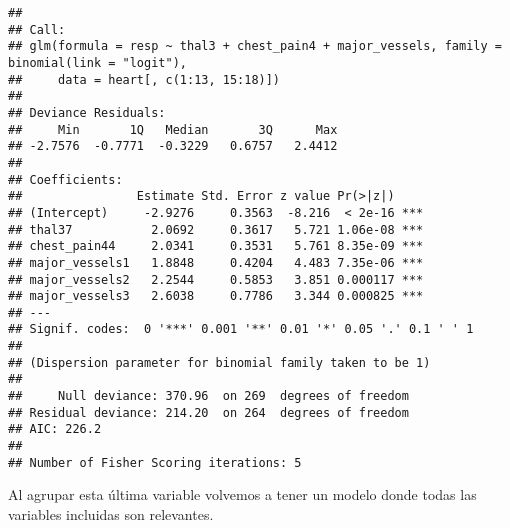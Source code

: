 \documentclass[]{article}
\newenvironment{Shaded}{\begin{snugshade}}{\end{snugshade}}
\newcommand{\KeywordTok}[1]{\textcolor[rgb]{0.13,0.29,0.53}{\textbf{#1}}}
\newcommand{\DataTypeTok}[1]{\textcolor[rgb]{0.13,0.29,0.53}{#1}}
\newcommand{\DecValTok}[1]{\textcolor[rgb]{0.00,0.00,0.81}{#1}}
\newcommand{\StringTok}[1]{\textcolor[rgb]{0.31,0.60,0.02}{#1}}
\newcommand{\OperatorTok}[1]{\textcolor[rgb]{0.81,0.36,0.00}{\textbf{#1}}}
\newcommand{\NormalTok}[1]{#1}
\begin{document}
\begin{Shaded}
\end{Shaded}

\begin{verbatim}
## 
## Call:
## glm(formula = resp ~ thal3 + chest_pain4 + major_vessels, family = binomial(link = "logit"), 
##     data = heart[, c(1:13, 15:18)])
## 
## Deviance Residuals: 
##     Min       1Q   Median       3Q      Max  
## -2.7576  -0.7771  -0.3229   0.6757   2.4412  
## 
## Coefficients:
##                Estimate Std. Error z value Pr(>|z|)    
## (Intercept)     -2.9276     0.3563  -8.216  < 2e-16 ***
## thal37           2.0692     0.3617   5.721 1.06e-08 ***
## chest_pain44     2.0341     0.3531   5.761 8.35e-09 ***
## major_vessels1   1.8848     0.4204   4.483 7.35e-06 ***
## major_vessels2   2.2544     0.5853   3.851 0.000117 ***
## major_vessels3   2.6038     0.7786   3.344 0.000825 ***
## ---
## Signif. codes:  0 '***' 0.001 '**' 0.01 '*' 0.05 '.' 0.1 ' ' 1
## 
## (Dispersion parameter for binomial family taken to be 1)
## 
##     Null deviance: 370.96  on 269  degrees of freedom
## Residual deviance: 214.20  on 264  degrees of freedom
## AIC: 226.2
## 
## Number of Fisher Scoring iterations: 5
\end{verbatim}

Al agrupar esta última variable volvemos a tener un modelo donde todas
las variables incluidas son relevantes.
\end{document}
